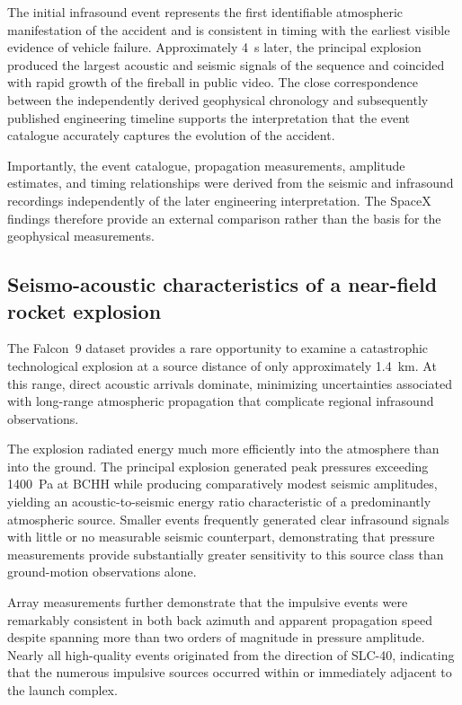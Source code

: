 \documentclass[]{seismica}
\begin{document}
The initial infrasound event represents the first identifiable atmospheric manifestation of the accident and is consistent in timing with the earliest visible evidence of vehicle failure. Approximately 4~s later, the principal explosion produced the largest acoustic and seismic signals of the sequence and coincided with rapid growth of the fireball in public video. The close correspondence between the independently derived geophysical chronology and subsequently published engineering timeline supports the interpretation that the event catalogue accurately captures the evolution of the accident.

Importantly, the event catalogue, propagation measurements, amplitude estimates, and timing relationships were derived from the seismic and infrasound recordings independently of the later engineering interpretation. The SpaceX findings therefore provide an external comparison rather than the basis for the geophysical measurements.

\subsection{Seismo-acoustic characteristics of a near-field rocket explosion}
\label{sec:discussion_characteristics}

The Falcon~9 dataset provides a rare opportunity to examine a catastrophic technological explosion at a source distance of only approximately 1.4~km. At this range, direct acoustic arrivals dominate, minimizing uncertainties associated with long-range atmospheric propagation that complicate regional infrasound observations.

The explosion radiated energy much more efficiently into the atmosphere than into the ground. The principal explosion generated peak pressures exceeding 1400~Pa at BCHH while producing comparatively modest seismic amplitudes, yielding an acoustic-to-seismic energy ratio characteristic of a predominantly atmospheric source. Smaller events frequently generated clear infrasound signals with little or no measurable seismic counterpart, demonstrating that pressure measurements provide substantially greater sensitivity to this source class than ground-motion observations alone.

Array measurements further demonstrate that the impulsive events were remarkably consistent in both back azimuth and apparent propagation speed despite spanning more than two orders of magnitude in pressure amplitude. Nearly all high-quality events originated from the direction of SLC-40, indicating that the numerous impulsive sources occurred within or immediately adjacent to the launch complex.
\end{document}
